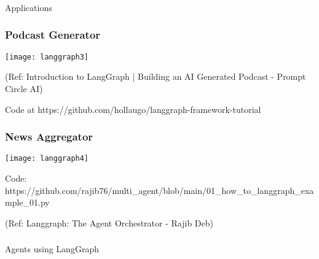 \begin{frame}[fragile]\frametitle{}
\begin{center}
{\Large Applications}
\end{center}
\end{frame}


\begin{frame}\frametitle{Podcast Generator}

\begin{center}
\texttt{[image: langgraph3]}
\end{center}	  


{\tiny (Ref: Introduction to LangGraph | Building an AI Generated Podcast - Prompt Circle AI)}

Code at https://github.com/hollaugo/langgraph-framework-tutorial
\end{frame}


\begin{frame}[fragile]\frametitle{News Aggregator}

\begin{center}
\texttt{[image: langgraph4]}
\end{center}	

Code: https://github.com/rajib76/multi\_agent/blob/main/01\_how\_to\_langgraph\_example\_01.py

{\tiny (Ref: Langgraph: The Agent Orchestrator - Rajib Deb)}


\end{frame}

\begin{frame}[fragile]\frametitle{}
\begin{center}
{\Large Agents using LangGraph}
\end{center}
\end{frame}

